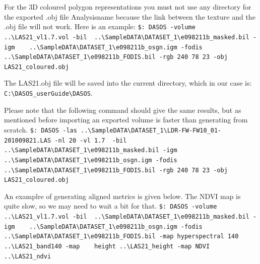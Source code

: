\documentclass{subfiles}
\begin{document}
	   \par For the 3D coloured polygon representations you must not use any directory for the exported .obj file Analysisname because the link between the texture and the .obj file will not work. Here is an example:\newline
	    \verb|$: DASOS -volume ..\LAS21_vl1.7.vol -bil |\newline \verb| ..\SampleDATA\DATASET_1\e098211b_masked.bil -igm |\newline \verb|   ..\SampleDATA\DATASET_1\e098211b_osgn.igm -fodis |\newline \verb|   ..\SampleDATA\DATASET_1\e098211b_FODIS.bil -rgb 240 78 23 -obj |\newline \verb|   LAS21_coloured.obj|\par 
	    \par The LAS21.obj file will be saved into the current directory, which in our case is: \newline \verb|C:\DASOS_userGuide\DASOS|. 
	    \par Please note that the following command should give the same results, but as mentioned before importing an exported volume is faster than generating from scratch. \newline
	    \verb|$: DASOS -las ..\SampleDATA\DATASET_1\LDR-FW-FW10_01-201009821.LAS -nl 20 |\newline \verb|-vl 1.7  -bil    ..\SampleDATA\DATASET_1\e098211b_masked.bil -igm  |\newline \verb|   ..\SampleDATA\DATASET_1\e098211b_osgn.igm -fodis |\newline \verb|   ..\SampleDATA\DATASET_1\e098211b_FODIS.bil -rgb 240 78 23 -obj |\newline \verb| LAS21_coloured.obj|
	    
	    \par An examplre of generating aligned metrics is given below. The NDVI map is quite slow, so we may need to wait a bit for that.\newline
	    \verb|$: DASOS -volume ..\LAS21_vl1.7.vol -bil |\newline \verb| ..\SampleDATA\DATASET_1\e098211b_masked.bil -igm |\newline \verb|   ..\SampleDATA\DATASET_1\e098211b_osgn.igm -fodis |\newline \verb|   ..\SampleDATA\DATASET_1\e098211b_FODIS.bil -map hyperspectral 140 |\newline \verb|..\LAS21_band140 -map    height ..\LAS21_height -map NDVI ..\LAS21_ndvi|
	    
\end{document}
